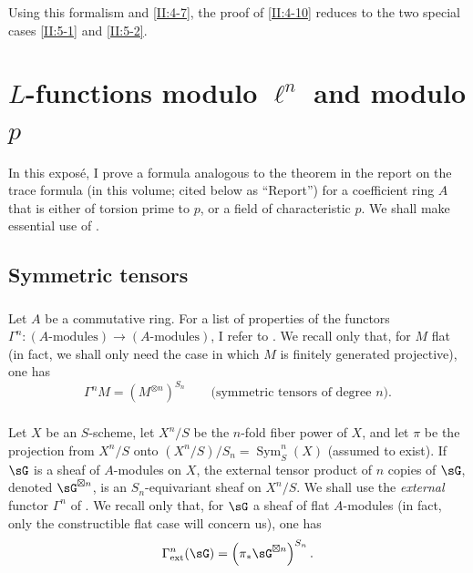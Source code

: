 \documentclass[12pt,oneside,english]{smfbook}
\newcounter{char}
\begin{document}
Using this formalism and \ref{II:4-7}, the proof of \ref{II:4-10} reduces to the two special cases \ref{II:5-1} and \ref{II:5-2}.
\clearpage
\clearpage
\chapter{\texorpdfstring{$L$}{L}-functions modulo \texorpdfstring{$\ell^n$}{l n} and modulo \texorpdfstring{$p$}{p}}\label{III}

In this exposé, I prove a formula analogous to the theorem in the report on the trace formula (in this volume; cited below as ``Report'') for a coefficient ring $A$ that is either of torsion prime to $p$, or a field of characteristic $p$. We shall make essential use of \cite[XVII 5.5]{sga4}.

\section{Symmetric tensors}\label{III:1}

\subsection{}\label{III:1-1}

Let $A$ be a commutative ring. For a list of properties of the functors $\Gamma^n:(\text{$A$-modules})\to(\text{$A$-modules})$, I refer to \cite[XVII 5.5.1 and 2]{sga4}. We recall only that, for $M$ flat (in fact, we shall only need the case in which $M$ is finitely generated projective), one has
\[
  \Gamma^n M = \left(M^{\otimes n}\right)^{S_n} \qquad
  \text{(symmetric tensors of degree $n$).}
\]

\subsection{}\label{III:1-2}

Let $X$ be an $S$-scheme, let $X^n/S$ be the $n$-fold fiber power of $X$, and let $\pi$ be the projection from $X^n/S$ onto $(X^n/S)/S_n=\operatorname{Sym}_S^n(X)$ (assumed to exist). If $\sG$ is a sheaf of $A$-modules on $X$, the external tensor product of $n$ copies of $\sG$, denoted $\sG^{\boxtimes n}$, is an $S_n$-equivariant sheaf on $X^n/S$. We shall use the \emph{external} functor $\Gamma^n$ of \cite[XVII 5.5.7--9]{sga4}. We recall only that, for $\sG$ a sheaf of flat $A$-modules (in fact, only the constructible flat case will concern us), one has
\[
  \Gamma_\text{ext}^n(\sG) = \left(\pi_*\sG^{\boxtimes n}\right)^{S_n} \text{.}
\]
\end{document}
